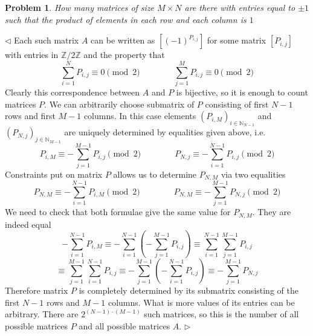\documentclass[12pt]{article}
\newtheorem{problem}{Problem}[subsection]
\newenvironment{solution}{\par $\triangleleft$}{$\triangleright$}
\begin{document}
\begin{problem} How many matrices of size $M\times N$ are there with entries
equal to $\pm 1$ such that the product of elements in each row and each column
is $1$
\end{problem}
\begin{solution} Each such matrix $A$ can be written as $[{(-1)}^{P_{i,j}}]$ for
    some matrix $[P_{i,j}]$ with entries in $\mathbb{Z}/2\mathbb{Z}$ and the
    property that
    $$
        \sum_{i=1}^N P_{i,j}\equiv 0 \pmod 2
        \qquad\qquad \sum_{j=1}^M P_{i,j}\equiv 0 \pmod 2
    $$
    Clearly this correspondence between $A$ and $P$ is bijective, so it is
    enough to count matrices $P$. We can arbitrarily choose submatrix of $P$
    consisting of first $N-1$ rows and first $M-1$ columns. In this case
    elements ${(P_{i,M})}_{i\in\mathbb{N}_{N-1}}$ and
    ${(P_{N,j})}_{j\in\mathbb{N}_{M-1}}$ are uniquely determined by equalities
    given above, i.e.
    $$
        P_{i,M}\equiv-\sum_{j=1}^{M-1}P_{i,j} \pmod 2\qquad\qquad
        P_{N,j}\equiv-\sum_{i=1}^{N-1}P_{i,j} \pmod 2
    $$
    Constraints put on matrix $P$ allows us to determine $P_{N,M}$ via two
    equalities
    $$
        P_{N,M}\equiv-\sum_{i=1}^{N-1}P_{i,M} \pmod 2\qquad\qquad
        P_{N,M}\equiv-\sum_{j=1}^{M-1}P_{N,j} \pmod 2
    $$
    We need to check that both formulae give the same value for $P_{N,M}$. They
    are indeed equal
    $$
        -\sum_{i=1}^{N-1}P_{i,M}
        \equiv-\sum_{i=1}^{N-1}\left(-\sum_{j=1}^{M-1}P_{i,j}\right)
        \equiv\sum_{i=1}^{N-1}\sum_{j=1}^{M-1}P_{i,j}
    $$
    $$
        \equiv\sum_{j=1}^{M-1}\sum_{i=1}^{N-1}P_{i,j}
        \equiv-\sum_{j=1}^{M-1}\left(-\sum_{i=1}^{N-1} P_{i,j}\right)
        \equiv-\sum_{j=1}^{M-1} P_{N,j}
    $$
    Therefore matrix $P$ is completely determined by its submatrix consisting of
    the first $N-1$ rows and $M-1$ columns. What is more values of its entries
    can be arbitrary. There are $2^{(N-1)\cdot(M-1)}$ such matrices, so this is
    the number of all possible matrices $P$ and all possible matrices $A$.
\end{solution}
\end{document}
